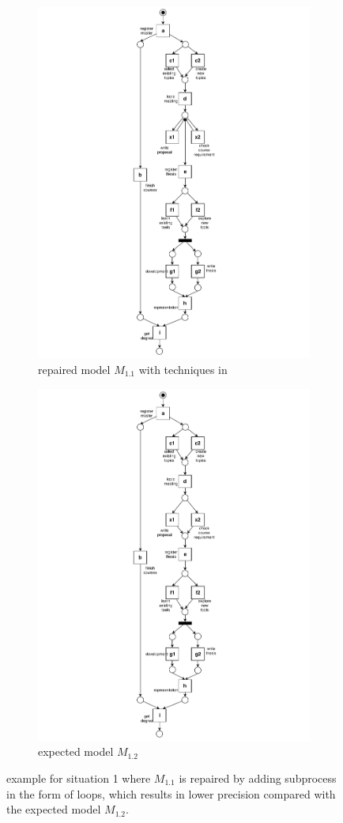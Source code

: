 \begin{figure}[htp]
	\centering
	\begin{subfigure}[b]{0.48\textwidth}
		\centering
		\includegraphics[clip, trim=7cm 0cm 7cm 0cm, width=0.5\linewidth, height=0.7\textheight]{figures/introduction/Master-add-events-loop.pdf}
		\caption{repaired model $M_{1.1}$ with techniques in \cite{fahland2015model}}
		\label{fig:model_b1}
	\end{subfigure}%
	\begin{subfigure}[b]{0.48\textwidth}
		\centering
		\includegraphics[clip, trim=7cm 0cm 7cm 0cm, width=0.5\linewidth, height=0.7\textheight]{figures/introduction/Master-add-events.pdf}
		\caption{expected model $M_{1.2}$}
		\label{fig:model_b2}
	\end{subfigure}
	\caption{example for situation 1 where $M_{1.1}$ is repaired by adding subprocess in the form of loops, which results in lower precision compared with the expected model $M_{1.2}$.}
	\label{fig:model_change_1}
\end{figure}
